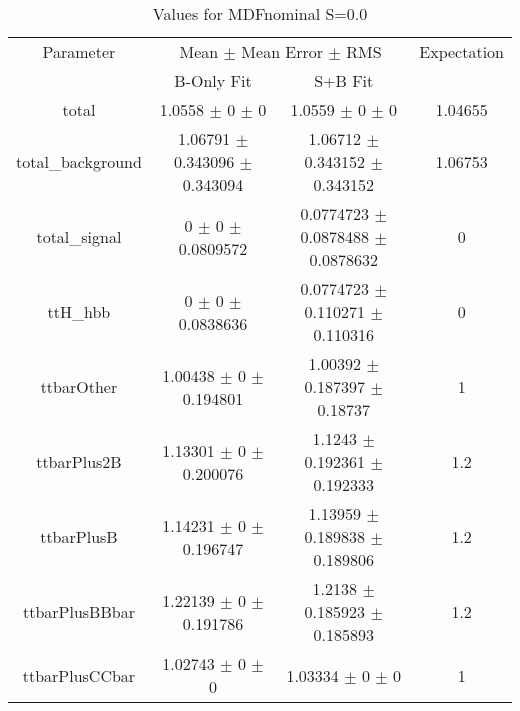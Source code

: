 \begin{table}
\centering
\caption{Values for MDFnominal S=0.0}
\begin{tabular}{cccc}
\toprule
Parameter & \multicolumn{2}{c}{Mean $\pm$ Mean Error $\pm$ RMS} & Expectation\\
 & B-Only Fit & S+B Fit & \\
\midrule
total & \num{1.0558} $\pm$ \num{0} $\pm$ \num{0} & \num{1.0559} $\pm$ \num{0} $\pm$ \num{0} & \num{1.04655}\\
total\_background & \num{1.06791} $\pm$ \num{0.343096} $\pm$ \num{0.343094} & \num{1.06712} $\pm$ \num{0.343152} $\pm$ \num{0.343152} & \num{1.06753}\\
total\_signal & \num{0} $\pm$ \num{0} $\pm$ \num{0.0809572} & \num{0.0774723} $\pm$ \num{0.0878488} $\pm$ \num{0.0878632} & \num{0}\\
ttH\_hbb & \num{0} $\pm$ \num{0} $\pm$ \num{0.0838636} & \num{0.0774723} $\pm$ \num{0.110271} $\pm$ \num{0.110316} & \num{0}\\
ttbarOther & \num{1.00438} $\pm$ \num{0} $\pm$ \num{0.194801} & \num{1.00392} $\pm$ \num{0.187397} $\pm$ \num{0.18737} & \num{1}\\
ttbarPlus2B & \num{1.13301} $\pm$ \num{0} $\pm$ \num{0.200076} & \num{1.1243} $\pm$ \num{0.192361} $\pm$ \num{0.192333} & \num{1.2}\\
ttbarPlusB & \num{1.14231} $\pm$ \num{0} $\pm$ \num{0.196747} & \num{1.13959} $\pm$ \num{0.189838} $\pm$ \num{0.189806} & \num{1.2}\\
ttbarPlusBBbar & \num{1.22139} $\pm$ \num{0} $\pm$ \num{0.191786} & \num{1.2138} $\pm$ \num{0.185923} $\pm$ \num{0.185893} & \num{1.2}\\
ttbarPlusCCbar & \num{1.02743} $\pm$ \num{0} $\pm$ \num{0} & \num{1.03334} $\pm$ \num{0} $\pm$ \num{0} & \num{1}\\
\bottomrule
\end{tabular}
\end{table}